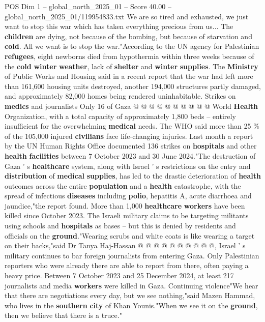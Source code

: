 \begin{textsample}{POS Dim 1 – global\_north\_2025\_01 – Score 40.00 – global\_north\_2025\_01/119954833.txt}
We are so tired and exhausted, we just want to stop this war which has taken everything precious from us...
The \textbf{children} are dying, not because of the bombing, but because of starvation and \textbf{cold}.
All we want is to stop the war."According to the UN agency for Palestinian \textbf{refugees}, eight newborns died from hypothermia within three weeks because of the \textbf{cold} \textbf{winter} \textbf{weather}, lack of \textbf{shelter} and \textbf{winter} \textbf{supplies}.
The \textbf{Ministry} of Public Works and Housing said in a recent report that the war had left more than 161,600 housing units destroyed, another 194,000 structures partly damaged, and approximately 82,000 homes being rendered uninhabitable.
Strikes on \textbf{medics} and journalists Only 16 of Gaza @ @ @ @ @ @ @ @ @ @ World \textbf{Health} Organization, with a total capacity of approximately 1,800 beds -- entirely insufficient for the overwhelming \textbf{medical} needs.
The WHO said more than 25 \% of the 105,000 injured \textbf{civilians} face life-changing injuries.
Last month a report by the UN Human Rights Office documented 136 strikes on \textbf{hospitals} and other \textbf{health} \textbf{facilities} between 7 October 2023 and 30 June 2024."The destruction of Gaza ' s \textbf{healthcare} system, along with Israel ' s restrictions on the entry and \textbf{distribution} of \textbf{medical} \textbf{supplies}, has led to the drastic deterioration of \textbf{health} outcomes across the entire \textbf{population} and a \textbf{health} catastrophe, with the spread of infectious \textbf{diseases} including \textbf{polio}, hepatitis A, acute diarrhoea and jaundice,"the report found.
More than 1,000 \textbf{healthcare} \textbf{workers} have been killed since October 2023.
The Israeli military claims to be targeting militants using schools and \textbf{hospitals} as bases -- but this is denied by residents and officials on the \textbf{ground}."Wearing scrubs and white coats is like wearing a target on their backs,"said Dr Tanya Haj-Hassan @ @ @ @ @ @ @ @ @ @, Israel ' s military continues to bar foreign journalists from entering Gaza.
Only Palestinian reporters who were already there are able to report from there, often paying a heavy price.
Between 7 October 2023 and 25 December 2024, at least 217 journalists and media \textbf{workers} were killed in Gaza.
Continuing violence"We hear that there are negotiations every day, but we see nothing,"said Mazen Hammad, who lives in the \textbf{southern} \textbf{city} of Khan Younis."When we see it on the \textbf{ground}, then we believe that there is a truce."

\end{textsample}
